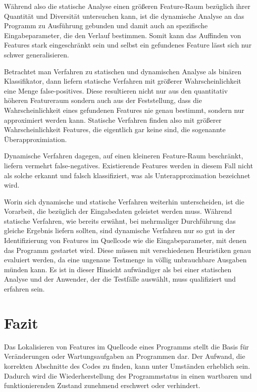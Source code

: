 \documentclass[runningheads,a4paper]{llncs}
\begin{document}
Während also die statische Analyse einen größeren Feature-Raum bezüglich ihrer Quantität und Diversität untersuchen kann, ist die dynamische
Analyse an das Programm zu Ausführung gebunden und damit auch an spezifische Eingabeparameter, die den Verlauf bestimmen. Somit kann das Auffinden von Features stark eingeschränkt sein und selbst ein gefundenes Feature lässt sich nur schwer generalisieren.

Betrachtet man Verfahren zu statischen und dynamischen Analyse als binären Klassifikator, dann liefern statische Verfahren mit größerer 
Wahrscheinlichkeit eine Menge false-positives. Diese resultieren nicht nur aus den quantitativ höheren Featureraum sondern auch aus
der Feststellung, dass die Wahrscheinlichkeit eines gefundenen Features nie genau bestimmt, sondern nur approximiert werden kann. Statische
Verfahren finden also mit größerer Wahrscheinlichkeit Features, die eigentlich gar keine sind, die sogenannte Überapproximiation.

Dynamische Verfahren dagegen, auf einen kleineren Feature-Raum beschränkt, liefern vermehrt false-negatives. Existierende Features
werden in diesem Fall nicht als solche erkannt und falsch klassifiziert, was als Unterapproximation bezeichnet wird.

Worin sich dynamische und statische Verfahren weiterhin unterscheiden, ist die Vorarbeit, die bezüglich der Eingabedaten geleistet werden muss. Während statische Verfahren, wie bereits erwähnt, bei mehrmaliger Durchführung das gleiche Ergebnis liefern sollten, sind dynamische Verfahren nur so gut in der Identifizierung von Features im Quellcode wie die Eingabeparameter, mit denen das Programm gestartet wird. Diese müssen mit verschiedenen Heuristiken genau evaluiert werden, da eine ungenaue Testmenge in völlig unbrauchbare Ausgaben münden kann. Es ist in dieser Hinsicht aufwändiger als bei einer statischen Analyse und der Anwender, der die Testfälle auswählt, muss qualifiziert und erfahren sein.

\clearpage

\section{Fazit}

Das Lokalisieren von Features im Quellcode eines Programms stellt die Basis für Veränderungen oder Wartungsaufgaben an Programmen dar. Der Aufwand, die korrekten Abschnitte des Codes zu finden, kann unter Umständen erheblich sein. Dadurch wird die Wiederherstellung des Programmstatus in einen wartbaren und funktionierenden Zustand zunehmend erschwert oder verhindert.
\end{document}
